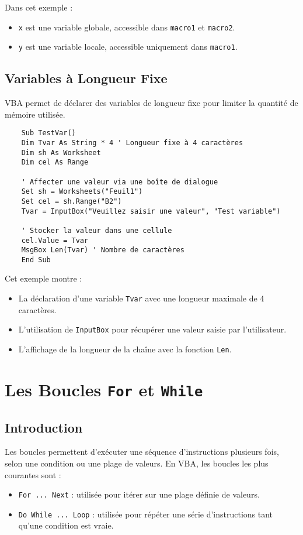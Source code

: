 \documentclass[a4paper,12pt]{report}
\begin{document}
Dans cet exemple :
\begin{itemize}
	\item \texttt{x} est une variable globale, accessible dans \texttt{macro1} et \texttt{macro2}.
	\item \texttt{y} est une variable locale, accessible uniquement dans \texttt{macro1}.
\end{itemize}

\section{Variables à Longueur Fixe}
VBA permet de déclarer des variables de longueur fixe pour limiter la quantité de mémoire utilisée.
\begin{lstlisting}
	Sub TestVar()
	Dim Tvar As String * 4 ' Longueur fixe à 4 caractères
	Dim sh As Worksheet
	Dim cel As Range
	
	' Affecter une valeur via une boîte de dialogue
	Set sh = Worksheets("Feuil1")
	Set cel = sh.Range("B2")
	Tvar = InputBox("Veuillez saisir une valeur", "Test variable")
	
	' Stocker la valeur dans une cellule
	cel.Value = Tvar
	MsgBox Len(Tvar) ' Nombre de caractères
	End Sub
\end{lstlisting}

Cet exemple montre :
\begin{itemize}
	\item La déclaration d'une variable \texttt{Tvar} avec une longueur maximale de 4 caractères.
	\item L'utilisation de \texttt{InputBox} pour récupérer une valeur saisie par l'utilisateur.
	\item L'affichage de la longueur de la chaîne avec la fonction \texttt{Len}.
\end{itemize}

\chapter{Les Boucles \texttt{For} et \texttt{While}}

\section{Introduction}
Les boucles permettent d'exécuter une séquence d'instructions plusieurs fois, selon une condition ou une plage de valeurs. En VBA, les boucles les plus courantes sont :
\begin{itemize}
	\item \texttt{For ... Next} : utilisée pour itérer sur une plage définie de valeurs.
	\item \texttt{Do While ... Loop} : utilisée pour répéter une série d'instructions tant qu'une condition est vraie.
\end{itemize}
\end{document}
